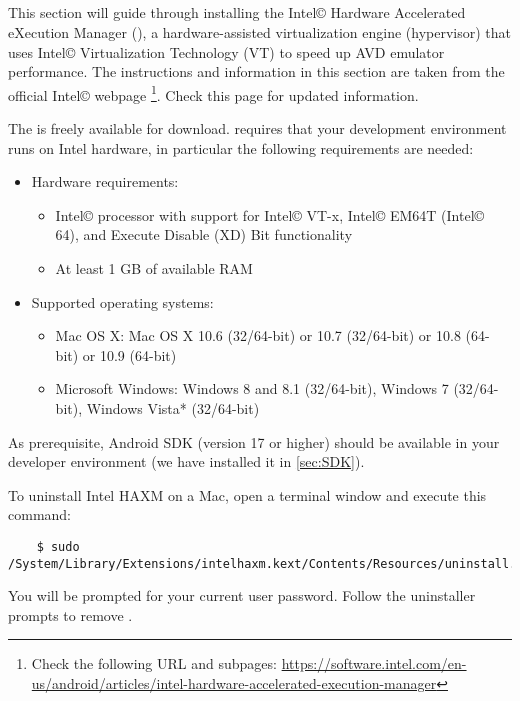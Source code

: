 \subsection{\intelHAXM{}\label{sec:HAXM}}

This section will guide through installing the Intel\copyright{} Hardware Accelerated
eXecution Manager (\intelHAXM), a hardware-assisted virtualization engine
(hypervisor) that uses Intel\copyright{} Virtualization Technology (VT) to speed up
AVD emulator performance.
The instructions and information in this section are taken from the official Intel\copyright{} webpage%
\footnote{Check the following URL and subpages: %
  \url{https://software.intel.com/en-us/android/articles/intel-hardware-accelerated-execution-manager}}.
Check this page for updated information.

The \intelHAXM{} is freely available for download.
\intelHAXM{}
requires that your development environment runs on Intel
hardware, in particular the following requirements are needed:
\begin{itemize}
   \item Hardware requirements:
      \begin{itemize}
   \item Intel\copyright{} processor with support for Intel\copyright{} VT-x,
      Intel\copyright{} EM64T (Intel\copyright{}
      64), and Execute Disable (XD) Bit functionality
   \item At least 1 GB of available RAM
\end{itemize}
\item Supported operating systems:
   \begin{itemize}
   \item Mac OS X: Mac OS X 10.6 (32/64-bit) or 10.7 (32/64-bit) or 10.8 (64-bit) or
      10.9 (64-bit)
   \item Microsoft Windows: Windows 8 and 8.1 (32/64-bit), Windows 7
      (32/64-bit), Windows Vista* (32/64-bit) 
\end{itemize}
\end{itemize}
As prerequisite, Android SDK (version 17 or higher) should be
available in your developer environment (we have installed it in \cref{sec:SDK}).




To uninstall Intel HAXM on a Mac, open a terminal window and execute this
command:
\begin{lstlisting}
	$ sudo /System/Library/Extensions/intelhaxm.kext/Contents/Resources/uninstall.sh
\end{lstlisting}
You will be prompted for your current user password. Follow the uninstaller
prompts to remove \intelHAXM{}.

